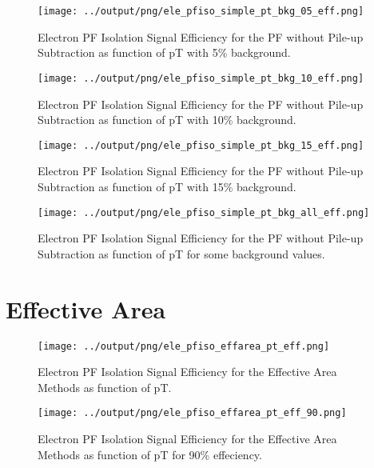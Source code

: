 \documentclass[11pt]{book}
\begin{document}
\begin{figure}[htb]
\centering
\texttt{[image: ../output/png/ele\_pfiso\_simple\_pt\_bkg\_05\_eff.png]}
\caption{Electron PF Isolation Signal Efficiency for the PF without Pile-up Subtraction as function of pT with 5\% background.}
\label{fig:ele_pfiso_pt_bkg_simple_bkg_05_eff}
\end{figure}

\begin{figure}[htb]
\centering
\texttt{[image: ../output/png/ele\_pfiso\_simple\_pt\_bkg\_10\_eff.png]}
\caption{Electron PF Isolation Signal Efficiency for the PF without Pile-up Subtraction as function of pT with 10\% background.}
\label{fig:ele_pfiso_pt_bkg_simple_bkg_10_eff}
\end{figure}

\begin{figure}[htb]
\centering
\texttt{[image: ../output/png/ele\_pfiso\_simple\_pt\_bkg\_15\_eff.png]}
\caption{Electron PF Isolation Signal Efficiency for the PF without Pile-up Subtraction as function of pT with 15\% background.}
\label{fig:ele_pfiso_pt_bkg_simple_bkg_15_eff}
\end{figure}

\begin{figure}[htb]
\centering
\texttt{[image: ../output/png/ele\_pfiso\_simple\_pt\_bkg\_all\_eff.png]}
\caption{Electron PF Isolation Signal Efficiency for the PF without Pile-up Subtraction as function of pT for some background values.}
\label{fig:ele_pfiso_pt_bkg_simple_bkg_all_eff}
\end{figure}
\clearpage

\section{Effective Area}

\begin{figure}[htb]
\centering
\texttt{[image: ../output/png/ele\_pfiso\_effarea\_pt\_eff.png]}
\caption{Electron PF Isolation Signal Efficiency for the Effective Area Methods as function of pT.}
\label{fig:ele_pfiso_pt_eff_effarea}
\end{figure}

\begin{figure}[htb]
\centering
\texttt{[image: ../output/png/ele\_pfiso\_effarea\_pt\_eff\_90.png]}
\caption{Electron PF Isolation Signal Efficiency for the Effective Area Methods as function of pT for 90\% effeciency.}
\label{fig:ele_pfiso_pt_eff_effarea_eff_90}
\end{figure}
\end{document}
